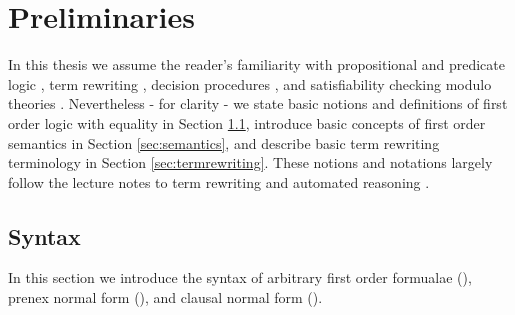 
\chapter{Preliminaries}

%

In this thesis we assume the reader's familiarity with
propositional and predicate logic \cite{Huth:2004:LCS:975331},
term rewriting \cite{Baader:1998:TR:280474},
decision procedures \cite{Kroening:2008:DPA:1391237},
and satisfiability checking modulo theories \cite{Biere:2009:HSV:1550723}.
Nevertheless - for clarity - we state basic notions and  definitions
of first order logic with equality in Section \ref{sec:syntax},
introduce basic concepts of first order semantics in Section \ref{sec:semantics},
and describe basic term rewriting terminology in Section \ref{sec:termrewriting}.
These notions and notations largely follow the lecture notes to term rewriting and automated reasoning \cite{AM2015tr, GM2013ar}.


\section{Syntax}\label{sec:syntax}

In this section we introduce the syntax of arbitrary first order formualae (\FOF),
prenex normal form (\PNF),
and clausal normal form (\CNF).

























